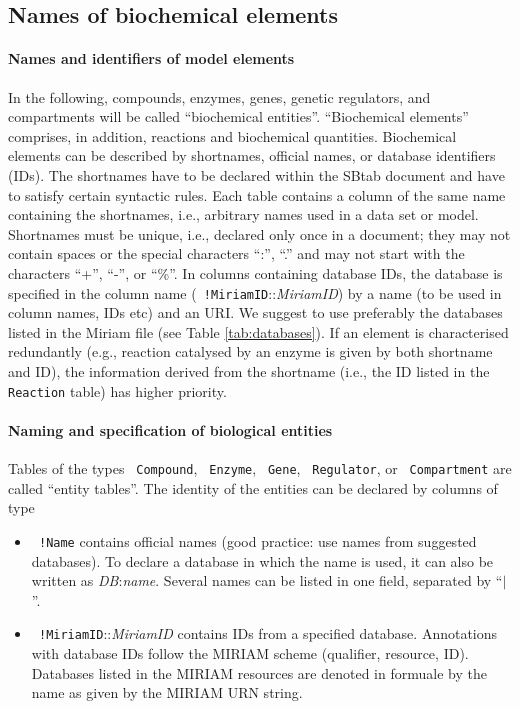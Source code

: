 \documentclass[a4paper]{article}
\newcommand{\la}[1]{}
\newcommand{\tab}[1]{{\texttt{\color{red} #1}}}
\newcommand{\col}[1]{\texttt{\color{blue} #1}}
\begin{document}
\subsection{Names of biochemical elements}

\paragraph{Names and identifiers of model elements}
In the following, compounds, enzymes, genes, genetic regulators, and
compartments will be called ``biochemical entities''. ``Biochemical
elements'' comprises, in addition, reactions and biochemical
quantities.  Biochemical elements can be described by shortnames,
official names, or database identifiers (IDs). The shortnames have to
be declared within the SBtab document and have to satisfy certain
syntactic rules. Each table contains a column of the same name
containing the shortnames, i.e., arbitrary names used in a data set or
model. Shortnames must be unique, i.e., declared only once in a
document; they may not contain spaces or the special characters ``:'',
``.'' and may not start with the characters ``+'', ``-'', or ``\%''.
In columns containing database IDs, the database is specified in the
column name (\col{!MiriamID}::\emph{MiriamID}) by a name (to be used
in column names, IDs etc) and an URI.  We suggest to use preferably
the databases listed in the Miriam file (see Table
\ref{tab:databases}).  \la{Other databases can be declared in a table
  of type \tab{AnnotationResource}.} If an element is characterised
redundantly (e.g., reaction catalysed by an enzyme is given by both
shortname and ID), the information derived from the shortname (i.e.,
the ID listed in the \tab{Reaction} table) has higher priority.

\paragraph{Naming and specification of biological entities}
Tables of the types \tab{Compound}, \tab{Enzyme}, \tab{Gene},
\tab{Regulator}, or \tab{Compartment} are called ``entity tables''.
The identity of the entities can be
 declared by columns of type
\begin{itemize}
\item \col{!Name} contains  official names (good practice: use names from
  suggested databases).  To declare a database in which the name is
  used, it can also be written as \emph{DB}:\emph{name}. Several
  names can be listed in one field, separated by ``$|$''.
\item \col{!MiriamID}::\emph{MiriamID} contains IDs from a specified database.
  Annotations with database IDs follow the MIRIAM scheme (qualifier,
  resource, ID). Databases listed in the MIRIAM resources
  \cite{MIRIAM} are denoted in formuale by the name as given by the MIRIAM URN
  string.
\end{itemize}
\end{document}
